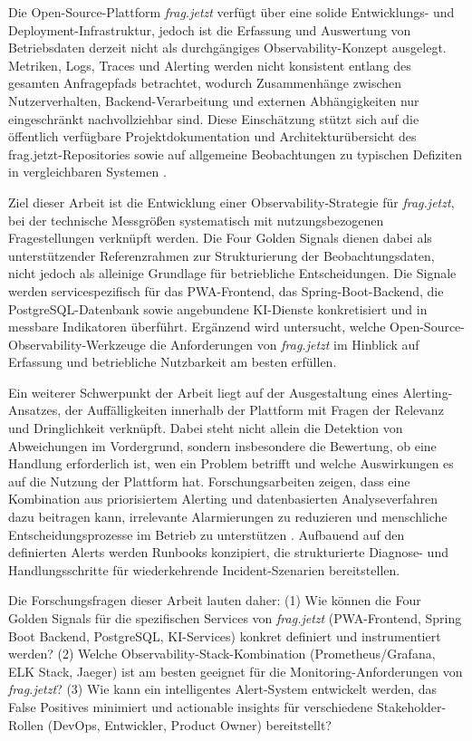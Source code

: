 Die Open-Source-Plattform \emph{frag.jetzt} verfügt über eine solide Entwicklungs- und Deployment-Infrastruktur, jedoch ist die Erfassung und Auswertung von Betriebsdaten derzeit nicht als durchgängiges Observability-Konzept ausgelegt. Metriken, Logs, Traces und Alerting werden nicht konsistent entlang des gesamten Anfragepfads betrachtet, wodurch Zusammenhänge zwischen Nutzerverhalten, Backend-Verarbeitung und externen Abhängigkeiten nur eingeschränkt nachvollziehbar sind. Diese Einschätzung stützt sich auf die öffentlich verfügbare Projektdokumentation und Architekturübersicht des frag.jetzt-Repositories \cite{fragjetztRepo} sowie auf allgemeine Beobachtungen zu typischen Defiziten in vergleichbaren Systemen \cite{giamattei2024monitoring}.

Ziel dieser Arbeit ist die Entwicklung einer Observability-Strategie für \emph{frag.jetzt}, bei der technische Messgrößen systematisch mit nutzungsbezogenen Fragestellungen verknüpft werden. Die Four Golden Signals dienen dabei als unterstützender Referenzrahmen zur Strukturierung der Beobachtungsdaten, nicht jedoch als alleinige Grundlage für betriebliche Entscheidungen. Die Signale werden servicespezifisch für das PWA-Frontend, das Spring-Boot-Backend, die PostgreSQL-Datenbank sowie angebundene KI-Dienste konkretisiert und in messbare Indikatoren überführt. Ergänzend wird untersucht, welche Open-Source-Observability-Werkzeuge die Anforderungen von \emph{frag.jetzt} im Hinblick auf Erfassung und betriebliche Nutzbarkeit am besten erfüllen.

Ein weiterer Schwerpunkt der Arbeit liegt auf der Ausgestaltung eines Alerting-Ansatzes, der Auffälligkeiten innerhalb der Plattform mit Fragen der Relevanz und Dringlichkeit verknüpft. Dabei steht nicht allein die Detektion von Abweichungen im Vordergrund, sondern insbesondere die Bewertung, ob eine Handlung erforderlich ist, wen ein Problem betrifft und welche Auswirkungen es auf die Nutzung der Plattform hat. Forschungsarbeiten zeigen, dass eine Kombination aus priorisiertem Alerting und datenbasierten Analyseverfahren dazu beitragen kann, irrelevante Alarmierungen zu reduzieren und menschliche Entscheidungsprozesse im Betrieb zu unterstützen \cite{jalalvand2024alert}. Aufbauend auf den definierten Alerts werden Runbooks konzipiert, die strukturierte Diagnose- und Handlungsschritte für wiederkehrende Incident-Szenarien bereitstellen.

Die Forschungsfragen dieser Arbeit lauten daher:
(1) Wie können die Four Golden Signals für die spezifischen Services von \emph{frag.jetzt} (PWA-Frontend, Spring Boot Backend, PostgreSQL, KI-Services) konkret definiert und instrumentiert werden?
(2) Welche Observability-Stack-Kombination (Prometheus/Grafana, ELK Stack, Jaeger) ist am besten geeignet für die Monitoring-Anforderungen von \emph{frag.jetzt}?
(3) Wie kann ein intelligentes Alert-System entwickelt werden, das False Positives minimiert und actionable insights für verschiedene Stakeholder-Rollen (DevOps, Entwickler, Product Owner) bereitstellt?



